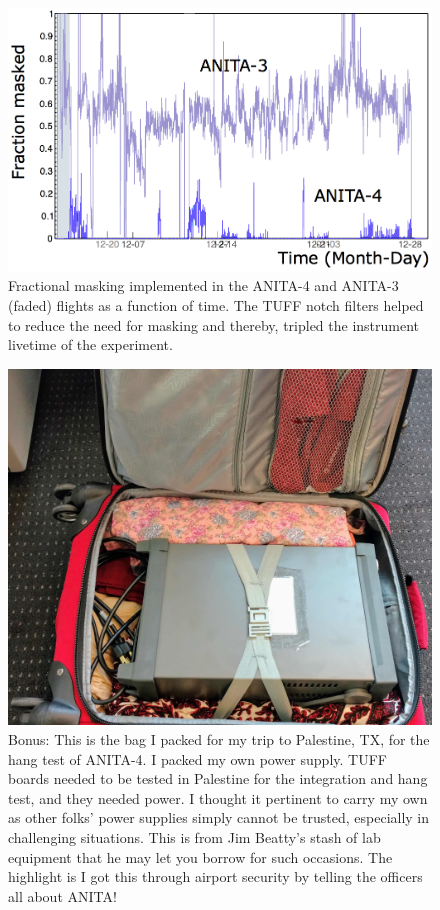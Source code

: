 \begin{figure}
\centering
\includegraphics[width=1.0\textwidth]{figures/masking_compare.png}
\caption{Fractional masking implemented in the ANITA-4 and ANITA-3 (faded) flights as a function of time. The TUFF notch filters helped to reduce the need for masking and thereby, tripled the instrument livetime of the experiment.}
\label{masking}
\end{figure}

\begin{figure}
\centering
\includegraphics[width=1.0\textwidth]{figures/bag_for_palestine.jpg}
\caption{Bonus: This is the bag I packed for my trip to Palestine, TX, for the hang test of ANITA-4. I packed my own power supply. TUFF boards needed to be tested in Palestine for the integration and hang test, and they needed power. I thought it pertinent to carry my own as other folks' power supplies simply cannot be trusted, especially in challenging situations. This is from Jim Beatty's stash of lab equipment that he may let you borrow for such occasions. The highlight is I got this through airport security by telling the officers all about ANITA!}
\label{palestine_bag}
\end{figure}